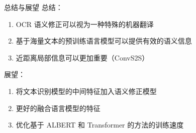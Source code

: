 \begin{frame}[c]{总结与展望}
	总结：
	\begin{enumerate}
		\item OCR 语义修正可以视为一种特殊的机器翻译
		\item 基于海量文本的预训练语言模型可以提供有效的语义信息
		\item 近距离局部信息可以更加重要（ConvS2S）
	\end{enumerate}
	展望：
	\begin{enumerate}
		\item 将文本识别模型的中间特征加入语义修正模型
		\item 更好的融合语言模型的特征
		\item 优化基于 ALBERT 和 Transformer 的方法的训练速度
	\end{enumerate}
\end{frame}

\begin{frame}[c]{}
	\begin{center}
		\begin{spacing}{2}
			{\LARGE {} \\ }
		\end{spacing}
	\end{center}
\end{frame}